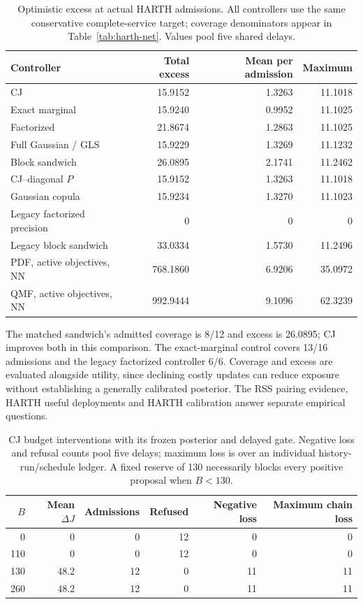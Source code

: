 \documentclass[10pt]{article}
\begin{document}
\begin{table}[t]
\centering\small
\caption{Optimistic excess at actual HARTH admissions. All controllers
use the same conservative complete-service target; coverage denominators
appear in Table~\ref{tab:harth-net}. Values pool five shared delays.}
\label{tab:harth-admitted-excess}
\begin{tabular}{lrrr}
\toprule
Controller & Total excess & Mean per admission & Maximum\\
\midrule
CJ & 15.9152 & 1.3263 & 11.1018\\
Exact marginal & 15.9240 & 0.9952 & 11.1025\\
Factorized & 21.8674 & 1.2863 & 11.1025\\
Full Gaussian / GLS & 15.9229 & 1.3269 & 11.1232\\
Block sandwich & 26.0895 & 2.1741 & 11.2462\\
CJ--diagonal $P$ & 15.9152 & 1.3263 & 11.1018\\
Gaussian copula & 15.9234 & 1.3270 & 11.1023\\
Legacy factorized precision & 0 & 0 & 0\\
Legacy block sandwich & 33.0334 & 1.5730 & 11.2496\\
PDF, active objectives, NN & 768.1860 & 6.9206 & 35.0972\\
QMF, active objectives, NN & 992.9444 & 9.1096 & 62.3239\\
\bottomrule
\end{tabular}
\end{table}

The matched sandwich's admitted coverage is 8/12 and excess is 26.0895;
CJ improves both in this comparison. The exact-marginal control covers
13/16 admissions and the legacy factorized controller 6/6. Coverage and
excess are evaluated alongside utility, since declining costly updates can
reduce exposure without establishing a generally calibrated posterior.
The RSS pairing evidence, HARTH useful deployments and HARTH calibration
answer separate empirical questions.

\begin{table}[t]
\centering\small
\caption{CJ budget interventions with its frozen posterior and delayed
gate. Negative loss and refusal counts pool five delays; maximum loss is
over an individual history-run/schedule ledger. A fixed reserve of 130
necessarily blocks every positive proposal when $B<130$.}
\label{tab:harth-budgets}
\begin{tabular}{rrrrrr}
\toprule
$B$ & Mean $\Delta J$ & Admissions & Refused & Negative loss
 & Maximum chain loss\\
\midrule
0 & 0 & 0 & 12 & 0 & 0\\
110 & 0 & 0 & 12 & 0 & 0\\
130 & 48.2 & 12 & 0 & 11 & 11\\
260 & 48.2 & 12 & 0 & 11 & 11\\
\bottomrule
\end{tabular}
\end{table}
\end{document}
